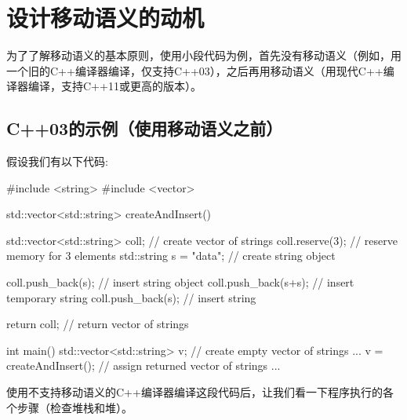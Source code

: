\section{设计移动语义的动机}
为了了解移动语义的基本原则，使用小段代码为例，首先没有移动语义（例如，用一个旧的C++编译器编译，仅支持C++03），之后再用移动语义（用现代C++编译器编译，支持C++11或更高的版本）。

\subsection{C++03的示例（使用移动语义之前）}

假设我们有以下代码:

\begin{cppcode}
#include <string>
#include <vector>

std::vector<std::string> createAndInsert()
{
	std::vector<std::string> coll; // create vector of strings
	coll.reserve(3); // reserve memory for 3 elements
	std::string s = "data"; // create string object

	coll.push_back(s); // insert string object
	coll.push_back(s+s); // insert temporary string
	coll.push_back(s); // insert string

	return coll; // return vector of strings
}

int main()
{
	std::vector<std::string> v; // create empty vector of strings
	...
	v = createAndInsert(); // assign returned vector of strings
	...
}
\end{cppcode}

使用不支持移动语义的C++编译器编译这段代码后，让我们看一下程序执行的各个步骤（检查堆栈和堆）。

